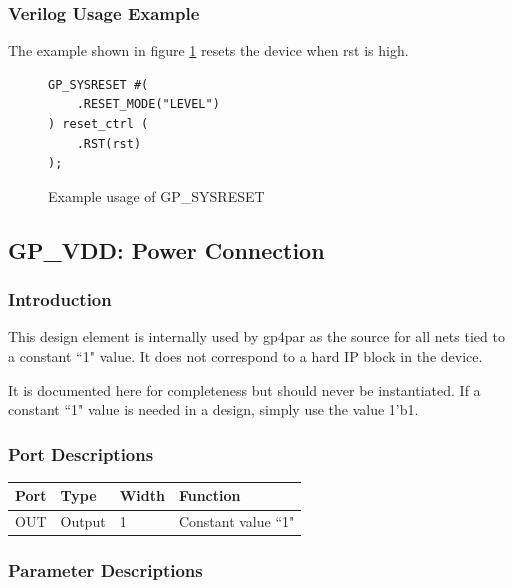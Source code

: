 \documentclass{article}
\begin{document}
\subsubsection{Verilog Usage Example}

The example shown in figure \ref{gp-sysreset-example} resets the device when rst is high.

\begin{figure}[h]
\begin{lstlisting}
GP_SYSRESET #(
	.RESET_MODE("LEVEL")
) reset_ctrl (
	.RST(rst)
);
\end{lstlisting}
\caption{Example usage of GP\_SYSRESET}
\label{gp-sysreset-example}
\end{figure}


\FloatBarrier
\pagebreak
\subsection{GP\_VDD: Power Connection}

\subsubsection{Introduction}
This design element is internally used by gp4par as the source for all nets tied to a constant ``1" value. It does not 
correspond to a hard IP block in the device.

It is documented here for completeness but should never be instantiated. If a constant ``1" value is needed in a 
design, simply use the value 1'b1.

\subsubsection{Port Descriptions}

\begin{tabularx}{4in}{|l|l|l|X|}
\hline
{\bfseries Port} & {\bfseries Type} & {\bfseries Width} & {\bfseries Function} \\
\hline
OUT & Output & 1 & Constant value ``1" \\
\hline
\end{tabularx}

\subsubsection{Parameter Descriptions}
\end{document}

